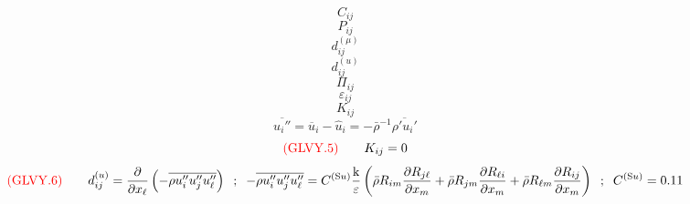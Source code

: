 \documentclass{article}
\begin{document}
\begin{equation}
C_{ij}
\end{equation}
\begin{equation}
P_{ij}
\end{equation}
\begin{equation}
d_{ij}^{(\mu)}
\end{equation}
\begin{equation}
d_{ij}^{(u)}
\end{equation}
\begin{equation}
\Pi_{ij}
\end{equation}
\begin{equation}
\varepsilon_{ij}
\end{equation}
\begin{equation}
K_{ij}
\end{equation}
\begin{equation}
\overline{u_i''}=\overline{u}_i-\hat{u}_i=-\bar{\rho}^{-1}\overline{\rho'u_i'}
\end{equation}
\begin{equation}
{\color{red}{({\rm GLVY}.5)}}\qquad
K_{ij}=0
\end{equation}
\begin{equation}
{\color{red}{({\rm GLVY}.6)}}\qquad
d_{ij}^{(u)}=\frac{\partial}{\partial x_\ell}\left(-\overline{\rho u_i'' u_j'' u_\ell''}\right)\;\; ; \;\;
-\overline{\rho u_i'' u_j'' u_\ell''}=C^{(\mathrm{\tiny S}u)}\frac{\mathrm{k} }
                                                           {\varepsilon}\left(\bar\rho R_{im}    \frac{\partial R_{j\ell} }{\partial x_m}
                                                                             +\bar\rho R_{jm}    \frac{\partial R_{\ell i}}{\partial x_m}
                                                                             +\bar\rho R_{\ell m}\frac{\partial R_{ij}    }{\partial x_m}\right)\;\; ; \;\;
C^{(\mathrm{\tiny S}u)}=0.11
\end{equation}
\end{document}
